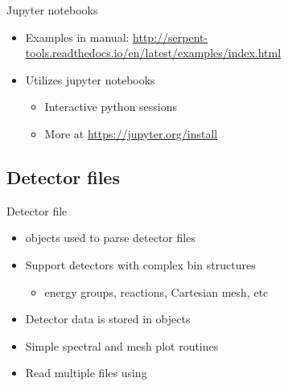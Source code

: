 \begin{frame}{Jupyter notebooks}
    \begin{itemize}
        
        \item Examples in manual: \url{http://serpent-tools.readthedocs.io/en/latest/examples/index.html}
        \item Utilizes jupyter notebooks\footnotemark[1]
            \begin{itemize}
                \item Interactive python sessions
                \item More at \url{https://jupyter.org/install}
            \end{itemize}
    \end{itemize}
\end{frame}

\subsection{Detector files}
\begin{frame}{Detector file}
    \begin{itemize}
        \item {} objects used to parse detector files
        \item Support detectors with complex bin structures
            \begin{itemize}
                \item energy groups, reactions, Cartesian mesh, etc
            \end{itemize}
        \item Detector data is stored in  objects
        \item Simple spectral and mesh plot routines
        \item Read multiple files using 
    \end{itemize}
\end{frame}

